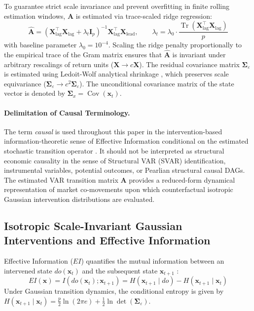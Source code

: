 \documentclass[review,12pt,authoryear]{elsarticle}
\begin{document}
To guarantee strict scale invariance and prevent overfitting in finite rolling estimation windows, $\mathbf{A}$ is estimated via trace-scaled ridge regression:
\begin{equation}
\hat{\mathbf{A}} = \left( \mathbf{X}_{\text{lag}}^\top \mathbf{X}_{\text{lag}} + \lambda_t \mathbf{I}_p \right)^{-1} \mathbf{X}_{\text{lag}}^\top \mathbf{X}_{\text{lead}}, \qquad \lambda_t = \lambda_0 \cdot \frac{\operatorname{Tr}(\mathbf{X}_{\text{lag}}^\top \mathbf{X}_{\text{lag}})}{p}
\label{eq:scaled_ridge}
\end{equation}
with baseline parameter $\lambda_0 = 10^{-4}$. Scaling the ridge penalty proportionally to the empirical trace of the Gram matrix ensures that $\hat{\mathbf{A}}$ is invariant under arbitrary rescalings of return units ($\mathbf{X} \to c\mathbf{X}$). The residual covariance matrix $\boldsymbol{\Sigma}_\varepsilon$ is estimated using Ledoit-Wolf analytical shrinkage \citep{ledoit2004well}, which preserves scale equivariance ($\boldsymbol{\Sigma}_\varepsilon \to c^2 \boldsymbol{\Sigma}_\varepsilon$). The unconditional covariance matrix of the state vector is denoted by $\boldsymbol{\Sigma}_x = \operatorname{Cov}(\mathbf{x}_t)$.

\paragraph{Delimitation of Causal Terminology.}
The term \emph{causal} is used throughout this paper in the intervention-based information-theoretic sense of Effective Information conditional on the estimated stochastic transition operator \citep{hoel2013quantifying, liu2024exact}. It should not be interpreted as structural economic causality in the sense of Structural VAR (SVAR) identification, instrumental variables, potential outcomes, or Pearlian structural causal DAGs. The estimated VAR transition matrix $\mathbf{A}$ provides a reduced-form dynamical representation of market co-movements upon which counterfactual isotropic Gaussian intervention distributions are evaluated.

\subsection{Isotropic Scale-Invariant Gaussian Interventions and Effective Information}
Effective Information ($EI$) quantifies the mutual information between an intervened state $do(\mathbf{x}_t)$ and the subsequent state $\mathbf{x}_{t+1}$ \citep{hoel2013quantifying}:
\begin{equation}
EI(\mathbf{x}) = I(do(\mathbf{x}_t); \mathbf{x}_{t+1}) = H(\mathbf{x}_{t+1} \mid do) - H(\mathbf{x}_{t+1} \mid \mathbf{x}_t)
\label{eq:ei_def_eq}
\end{equation}
Under Gaussian transition dynamics, the conditional entropy is given by $H(\mathbf{x}_{t+1} \mid \mathbf{x}_t) = \frac{p}{2}\ln(2\pi e) + \frac{1}{2}\ln\det(\boldsymbol{\Sigma}_\varepsilon)$.
\end{document}
